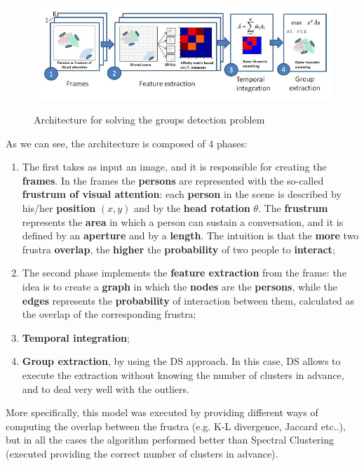 \begin{figure}[h!]
    \centering
    \includegraphics[scale = 1.5]{img/groups detection.jpg}
    \label{groups detection arch}
    \caption{Architecture for solving the groups detection problem}
\end{figure}

As we can see, the architecture is composed of 4 phases:

\begin{enumerate}
    \item The first takes as input an image, and it is responsible for creating the \textbf{frames}. In the frames the \textbf{persons} are represented with the so-called \textbf{frustrum of visual attention}: each \textbf{person} in the scene is described by his/her \textbf{position} $(x,y)$ and by the \textbf{head rotation} $\theta$. The \textbf{frustrum} represents the \textbf{area} in which a person can sustain a conversation, and it is defined by an \textbf{aperture} and by a \textbf{length}. The intuition is that the \textbf{more} two frustra \textbf{overlap}, the \textbf{higher} the \textbf{probability} of two people to \textbf{interact};
    \item The second phase implements the \textbf{feature extraction} from the frame: the idea is to create a \textbf{graph} in which the \textbf{nodes} are the \textbf{persons}, while the \textbf{edges} represents the \textbf{probability} of interaction between them, calculated as the overlap of the corresponding frustra;
    \item \textbf{Temporal integration};
    \item \textbf{Group extraction}, by using the DS approach. In this case, DS allows to execute the extraction without knowing the number of clusters in advance, and to deal very well with the outliers.
\end{enumerate}

More specifically, this model was executed by providing different ways of computing the overlap between the frustra (e.g. K-L divergence, Jaccard etc..), but in all the cases the algorithm performed better than Spectral Clustering (executed providing the correct number of clusters in advance).

